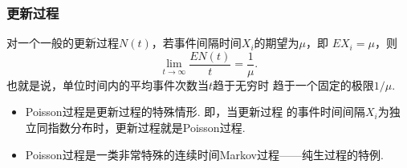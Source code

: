 \begin{frame}
    \frametitle{更新过程}
    \begin{mytheorem}[基本更新定理]
        对一个一般的更新过程$N(t)$，若事件间隔时间$X_i$的期望为$\mu$，即
        $EX_i=\mu$，则
        \begin{equation}
            \lim_{t\to\infty}\frac{EN(t)}{t}=\frac1\mu.
        \end{equation}
        也就是说，单位时间内的平均事件次数当$t$趋于无穷时
        趋于一个固定的极限$1/\mu$. 
    \end{mytheorem}
    \begin{myproposition}
        \begin{itemize}
            \item Poisson过程是更新过程的特殊情形. 即，当更新过程
            的事件时间间隔$X_i$为独立同指数分布时，更新过程就是Poisson过程. 
            \item Poisson过程是一类非常特殊的连续时间Markov过程——纯生过程的特例. 
        \end{itemize}
    \end{myproposition}
\end{frame}
